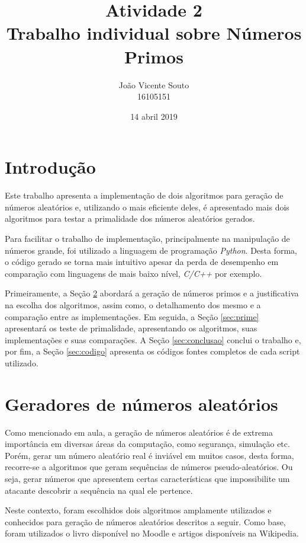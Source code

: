 \documentclass{article}
\title{%
  Atividade 2 \\
  Trabalho individual sobre Números Primos}
\author{João Vicente Souto \\ 16105151}
\date{14 abril 2019}
\begin{document}
\maketitle

\section{Introdução}

Este trabalho apresenta a implementação de dois algoritmos para geração de números aleatórios e, utilizando o mais eficiente deles, é apresentado mais dois algoritmos para testar a primalidade dos números aleatórios gerados.

Para facilitar o trabalho de implementação, principalmente na manipulação de números grande, foi utilizado a linguagem de programação \textit{Python}.
Desta forma, o código gerado se torna mais intuitivo apesar da perda de desempenho em comparação com linguagens de mais baixo nível, \textit{C/C++} por exemplo.

Primeiramente, a Seção \ref{sec:random} abordará a geração de números primos e a justificativa na escolha dos algoritmos, assim como, o detalhamento dos mesmo e a comparação entre as implementações.
Em seguida, a Seção \ref{sec:prime} apresentará os teste de primalidade, apresentando os algoritmos, suas implementações e suas comparações.
A Seção \ref{sec:conclusao} conclui o trabalho e, por fim, a Seção \ref{sec:codigo} apresenta os códigos fontes completos de cada script utilizado.

\section{Geradores de números aleatórios}
\label{sec:random}

Como mencionado em aula, a geração de números aleatórios é de extrema importância em diversas áreas da computação, como segurança, simulação etc.
Porém, gerar um número aleatório real é inviável em muitos casos, desta forma, recorre-se a algoritmos que geram sequências de números pseudo-aleatórios.
Ou seja, gerar números que apresentem certas características que impossibilite um atacante descobrir a sequência na qual ele pertence.

Neste contexto, foram escolhidos dois algoritmos amplamente utilizados e conhecidos para geração de números aleatórios descritos a seguir.
Como base, foram utilizados o livro \cite{bib:livro} disponível no Moodle e artigos disponíveis na Wikipedia.
\end{document}
